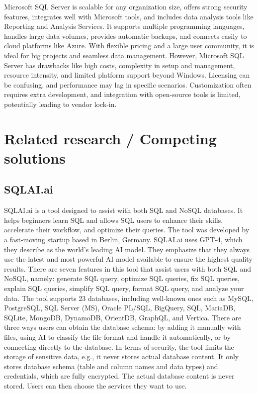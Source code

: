     Microsoft SQL Server is scalable for any organization size, offers strong security features, integrates well with Microsoft tools, and includes data analysis tools like Reporting and Analysis Services. It supports multiple programming languages, handles large data volumes, provides automatic backups, and connects easily to cloud platforms like Azure. With flexible pricing and a large user community, it is ideal for big projects and seamless data management. However, Microsoft SQL Server has drawbacks like high costs, complexity in setup and management, resource intensity, and limited platform support beyond Windows. Licensing can be confusing, and performance may lag in specific scenarios. Customization often requires extra development, and integration with open-source tools is limited, potentially leading to vendor lock-in.
    \cite{XTIVIA}
    

\section{Related research / Competing solutions}
    \subsection{SQLAI.ai}
    SQLAI.ai is a tool designed to assist with both SQL and NoSQL databases. It helps beginners learn SQL and allows SQL users to enhance their skills, accelerate their workflow, and optimize their queries. The tool was developed by a fast-moving startup based in Berlin, Germany. SQLAI.ai uses GPT-4, which they describe as the world's leading AI model. They emphasize that they always use the latest and most powerful AI model available to ensure the highest quality results. There are seven features in this tool that assist users with both SQL and NoSQL, namely: generate SQL query, optimize SQL queries, fix SQL queries, explain SQL queries, simplify SQL query, format SQL query, and analyze your data. The tool supports 23 databases, including well-known ones such as MySQL, PostgreSQL, SQL Server (MS), Oracle PL/SQL, BigQuery, SQL, MariaDB, SQLite, MongoDB, DynamoDB, OrientDB, GraphQL, and Vertica. There are three ways users can obtain the database schema: by adding it manually with files, using AI to classify the file format and handle it automatically, or by connecting directly to the database. In terms of security, the tool limits the storage of sensitive data, e.g., it never stores actual database content. It only stores database schema (table and column names and data types) and credentials, which are fully encrypted. The actual database content is never stored. Users can then choose the services they want to use.
    \cite{SQLAI}
    
